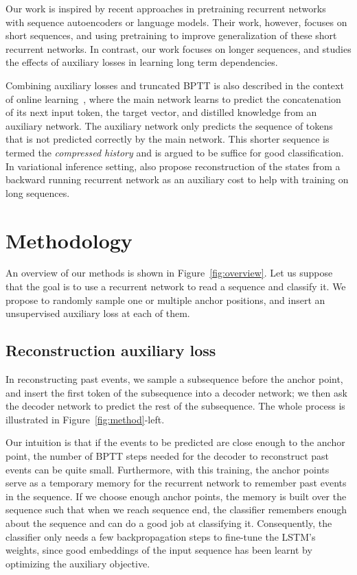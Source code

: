 \documentclass{article}
\begin{document}
Our work is inspired by recent approaches in pretraining recurrent networks~\cite{dai2015semi,ramachandran2016unsupervised} with sequence autoencoders or language models. Their work, however, focuses on short sequences, and using pretraining to improve generalization of these short recurrent networks. In contrast, our work focuses on longer sequences, and studies the effects of auxiliary losses in learning long term dependencies.

Combining auxiliary losses and truncated BPTT is also described in the context of online learning~\cite{schmidhuber1992learning}, where the main network learns to predict the concatenation of its next input token, the target vector, and distilled knowledge from an auxiliary network. The auxiliary network only predicts the sequence of tokens that is not predicted correctly by the main network. This shorter sequence is termed the {\it compressed history} and is argued to be suffice for good classification. In variational inference setting, \cite{goyal2017z} also propose reconstruction of the states from a backward running recurrent network as an auxiliary cost to help with training on long sequences.

\section{Methodology}

An overview of our methods is shown in Figure~\ref{fig:overview}. Let us suppose that the goal is to use a recurrent network to read a sequence and classify it. We propose to randomly sample one or multiple anchor positions, and insert an unsupervised auxiliary loss at each of them.

\subsection{Reconstruction auxiliary loss}

In reconstructing past events, we sample a subsequence before the anchor point, and insert the first token of the subsequence into a decoder network; we then ask the decoder network to predict the rest of the subsequence. The whole process is illustrated in Figure~\ref{fig:method}-left.

Our intuition is that if the events to be predicted are close enough to the anchor point, the number of BPTT steps needed for the decoder to reconstruct past events can be quite small. Furthermore, with this training, the anchor points serve as a temporary memory for the recurrent network to remember past events in the sequence. If we choose enough anchor points, the memory is built over the sequence such that when we reach sequence end, the classifier remembers enough about the sequence and can do a good job at classifying it. Consequently, the classifier only needs a few backpropagation steps to fine-tune the LSTM's weights, since good embeddings of the input sequence has been learnt by optimizing the auxiliary objective.
\end{document}
